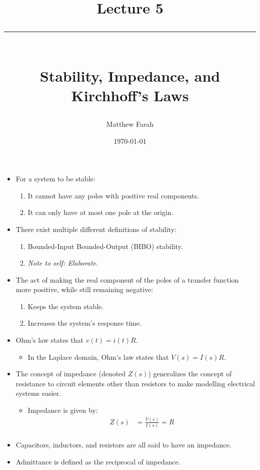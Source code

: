 \documentclass{article}
\date{
	\vspace{-.75em}
	{\large \today}
}
\title{
	\vspace*{-1.5em}
	{\Huge Lecture 5} \\
	\vspace{-1em}
	\rule{\textwidth/4}{.01em} \\
	\vspace{-.25em}
	{\Large Stability, Impedance, and Kirchhoff's Laws}
	\vspace{-.75em}
}
\author{
	{\large Matthew Farah}
}
\begin{document}
\maketitle
\pagestyle{fancy}

\fi

\begin{itemize}
	\item For a system to be stable:
	\begin{enumerate}
		\item It cannot have any poles with positive real components.
		\item It can only have at most one pole at the origin.
	\end{enumerate}
	\item There exist multiple different definitions of stability:
	\begin{enumerate}
		\item Bounded-Input Bounded-Output (BIBO) stability.
		\item \emph{Note to self: Elaborate}.
	\end{enumerate}
	\item The act of making the real component of the poles of a transfer function more positive, while still remaining negative:
	\begin{enumerate}
		\item Keeps the system stable.
		\item Increases the system's response time.
	\end{enumerate}
	\item Ohm's law states that $v(t) = i(t)R$.
	\begin{itemize}
		\item In the Laplace domain, Ohm's law states that $V(s) = I(s)R$.
	\end{itemize}
	\item The concept of impedance (denoted $Z(s)$) generalizes the concept of resistance to circuit elements other than resistors to make modelling electrical systems easier.
	\begin{itemize}
		\item Impedance is given by:
\begin{align*}
	Z(s) &= \frac{V(s)}{I(s)} = R \\
\end{align*}
	\end{itemize}
	\item Capacitors, inductors, and resistors are all said to have an impedance.
	\item Admittance is defined as the reciprocal of impedance.

\end{itemize}
\end{document}
